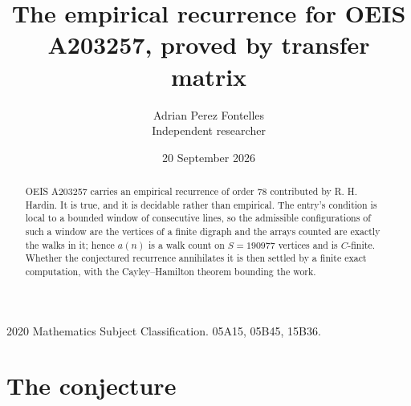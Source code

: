 \documentclass[11pt,a4paper]{article}
\title{The empirical recurrence for OEIS A203257, proved by transfer matrix}
\author{Adrian Perez Fontelles\\ \small Independent researcher}
\date{20 September 2026}
\theoremstyle{plain}
\theoremstyle{definition}
\begin{document}
\maketitle

\begin{abstract}
OEIS A203257 carries an empirical recurrence of order $78$ contributed by R. H. Hardin. It is
true, and it is decidable rather than empirical. The entry's condition is local to a bounded window of consecutive lines, so
the admissible configurations of such a window are the vertices of a finite digraph and the
arrays counted are exactly the walks in it; hence $a(n)$ is a walk count on $S=190977$ vertices
and is $C$-finite. Whether the conjectured recurrence annihilates it is then settled by a
finite exact computation, with the Cayley--Hamilton theorem bounding the work.
\end{abstract}

\noindent\small 2020 Mathematics Subject Classification. 05A15, 05B45, 15B36.\normalsize

\section{The conjecture}
\end{document}
